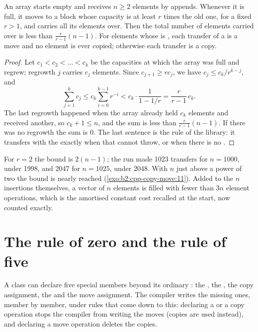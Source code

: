 \begin{proposition}\label{prop:b2:cpp-copy-move:growth-moves}
An array starts empty and receives $n \geq 2$ elements by appends. Whenever it is full, it moves to a block whose
capacity is at least $r$ times the old one, for a fixed $r > 1$, and carries all its elements over. Then the total
number of elements carried over is less than $\frac{r}{r-1}(n-1)$. For elements whose  is
, each transfer of a  is a move and no element is ever copied; otherwise each
transfer is a copy.
\end{proposition}

\begin{proof}
Let $c_1 < c_2 < \dots < c_k$ be the capacities at which the array was full and regrew; regrowth $j$ carries $c_j$
elements. Since $c_{j+1} \geq r c_j$, we have $c_j \leq c_k / r^{k-j}$, and
\[ \sum_{j=1}^{k} c_j \leq c_k \sum_{i=0}^{k-1} r^{-i} < c_k \cdot \frac{1}{1 - 1/r} = \frac{r}{r-1}\, c_k . \]
The last regrowth happened when the array already held $c_k$ elements and received another, so $c_k + 1 \leq n$,
and the sum is less than $\frac{r}{r-1}(n-1)$. If there was no regrowth the sum is $0$. The last sentence is the rule
of the library: it transfers with the  exactly when that  cannot throw, or when there is
no .
\end{proof}

For $r = 2$ the bound is $2(n-1)$; the run made 1023 transfers for $n = 1000$, under 1998, and 2047 for $n = 1025$,
under 2048. With $n$ just above a power of two the bound is nearly reached (\cref{exo:b2:cpp-copy-move:11}). Added
to the $n$ insertions themselves, a vector of $n$ elements is filled with fewer than $3n$ element operations, which is
the amortised constant cost recalled at the start, now counted exactly.

\section{The rule of zero and the rule of five}\label{sec:b2:cpp-copy-move:rules}

A class can declare five special members beyond its ordinary : the , the ,
the copy assignment, the  and the move assignment. The compiler writes the missing ones, member by
member, under rules that come down to this: declaring a  or a copy operation stops the compiler from
writing the moves (copies are used instead), and declaring a move operation deletes the copies.

